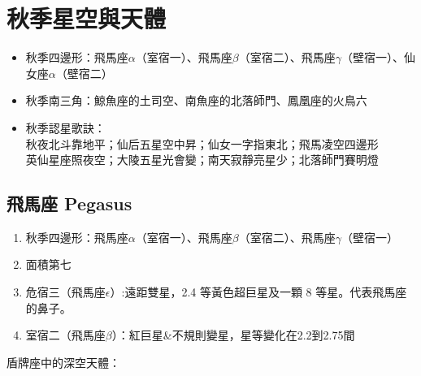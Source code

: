 \section{秋季星空與天體}
\begin{itemize}
    \item 秋季四邊形：飛馬座\(\alpha\)（室宿一）、飛馬座\(\beta\)（室宿二）、飛馬座\(\gamma\)（壁宿一）、仙女座\(\alpha\)（壁宿二）
    \item 秋季南三角：鯨魚座的土司空、南魚座的北落師門、鳳凰座的火鳥六
    \item 秋季認星歌訣：\\秋夜北斗靠地平；仙后五星空中昇；仙女一字指東北；飛馬凌空四邊形\\英仙星座照夜空；大陵五星光會變；南天寂靜亮星少；北落師門賽明燈
\end{itemize}

\subsection{飛馬座 Pegasus}
\begin{enumerate}
    \item 秋季四邊形：飛馬座\(\alpha\)（室宿一）、飛馬座\(\beta\)（室宿二）、飛馬座\(\gamma\)（壁宿一）
    \item 面積第七
    \item 危宿三（飛馬座\(\epsilon\)）:遠距雙星，2.4 等黃色超巨星及一顆 8 等星。代表飛馬座的鼻子。
    \item 室宿二（飛馬座\(\beta\)）：紅巨星\&不規則變星，星等變化在2.2到2.75間
\end{enumerate}
盾牌座中的深空天體：
\newline

